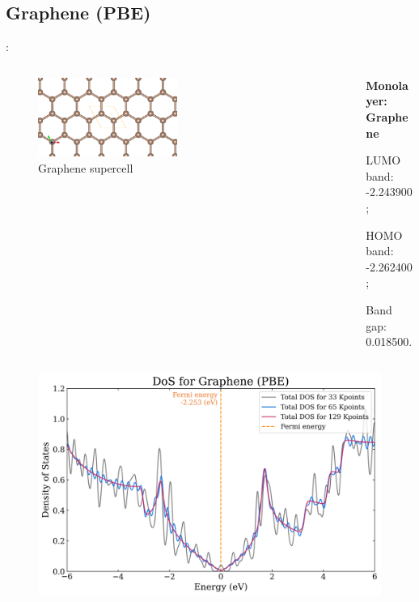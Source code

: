 \documentclass[xcolor=dvipsnames]{beamer}
\begin{document}
\subsection{Graphene (PBE)}
\begin{frame}{\insertsection: \insertsubsection}
\begin{columns}
    \begin{column}{0.5\textwidth}\begin{figure}
        \includegraphics[width=0.5\textwidth]{Supercells/D_Graphene.png}
        \caption{Graphene supercell}
    \end{figure}\end{column}
    \begin{column}{0.5\textwidth}
        \par \textbf{Monolayer: Graphene}
        \par\quad LUMO band: -2.243900;
        \par\quad HOMO band: -2.262400;
        \par\quad Band gap: 0.018500.
    \end{column}
\end{columns}
\begin{columns}
    \begin{column}{0.45\textwidth}\begin{figure}
        \includegraphics[width=1\textwidth]{PDoS/Graphene_dos}

\end{figure}
\end{column}
\end{columns}
\end{frame}
\end{document}
